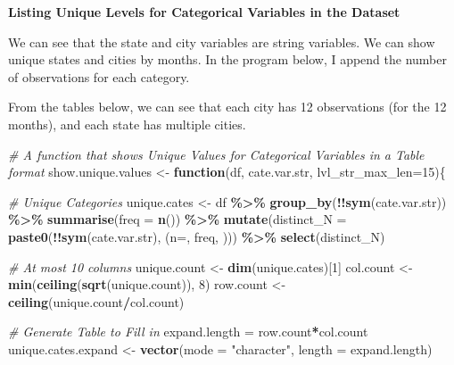 \documentclass[
]{book}
\newenvironment{Shaded}{\begin{snugshade}}{\end{snugshade}}
\newcommand{\CommentTok}[1]{\textcolor[rgb]{0.56,0.35,0.01}{\textit{#1}}}
\newcommand{\ControlFlowTok}[1]{\textcolor[rgb]{0.13,0.29,0.53}{\textbf{#1}}}
\newcommand{\DataTypeTok}[1]{\textcolor[rgb]{0.13,0.29,0.53}{#1}}
\newcommand{\DecValTok}[1]{\textcolor[rgb]{0.00,0.00,0.81}{#1}}
\newcommand{\KeywordTok}[1]{\textcolor[rgb]{0.13,0.29,0.53}{\textbf{#1}}}
\newcommand{\NormalTok}[1]{#1}
\newcommand{\OperatorTok}[1]{\textcolor[rgb]{0.81,0.36,0.00}{\textbf{#1}}}
\newcommand{\StringTok}[1]{\textcolor[rgb]{0.31,0.60,0.02}{#1}}
\begin{document}
\textbf{Listing Unique Levels for Categorical Variables in the Dataset}

We can see that the state and city variables are string variables. We can show unique states and cities by months. In the program below, I append the number of observations for each category.

From the tables below, we can see that each city has 12 observations (for the 12 months), and each state has multiple cities.

\begin{Shaded}
\begin{Highlighting}[]
\CommentTok{\# A function that shows Unique Values for Categorical Variables in a Table format}
\NormalTok{show.unique.values \textless{}{-}}\StringTok{ }\ControlFlowTok{function}\NormalTok{(df, cate.var.str, }\DataTypeTok{lvl\_str\_max\_len=}\DecValTok{15}\NormalTok{)\{}

    \CommentTok{\# Unique Categories}
\NormalTok{    unique.cates \textless{}{-}}\StringTok{ }\NormalTok{df }\OperatorTok{\%\textgreater{}\%}
\StringTok{        }\KeywordTok{group\_by}\NormalTok{(}\OperatorTok{!!}\KeywordTok{sym}\NormalTok{(cate.var.str)) }\OperatorTok{\%\textgreater{}\%}
\StringTok{        }\KeywordTok{summarise}\NormalTok{(}\DataTypeTok{freq =} \KeywordTok{n}\NormalTok{()) }\OperatorTok{\%\textgreater{}\%}
\StringTok{        }\KeywordTok{mutate}\NormalTok{(}\DataTypeTok{distinct\_N =} \KeywordTok{paste0}\NormalTok{(}\OperatorTok{!!}\KeywordTok{sym}\NormalTok{(cate.var.str), }\StringTok{\textquotesingle{} (n=\textquotesingle{}}\NormalTok{, freq, }\StringTok{\textquotesingle{})\textquotesingle{}}\NormalTok{)) }\OperatorTok{\%\textgreater{}\%}
\StringTok{        }\KeywordTok{select}\NormalTok{(distinct\_N)}

    \CommentTok{\# At most 10 columns}
\NormalTok{    unique.count \textless{}{-}}\StringTok{ }\KeywordTok{dim}\NormalTok{(unique.cates)[}\DecValTok{1}\NormalTok{]}
\NormalTok{    col.count \textless{}{-}}\StringTok{ }\KeywordTok{min}\NormalTok{(}\KeywordTok{ceiling}\NormalTok{(}\KeywordTok{sqrt}\NormalTok{(unique.count)), }\DecValTok{8}\NormalTok{)}
\NormalTok{    row.count \textless{}{-}}\StringTok{ }\KeywordTok{ceiling}\NormalTok{(unique.count}\OperatorTok{/}\NormalTok{col.count)}

    \CommentTok{\# Generate Table to Fill in}
\NormalTok{    expand.length =}\StringTok{ }\NormalTok{row.count}\OperatorTok{*}\NormalTok{col.count}
\NormalTok{    unique.cates.expand \textless{}{-}}\StringTok{ }\KeywordTok{vector}\NormalTok{(}\DataTypeTok{mode =} \StringTok{"character"}\NormalTok{, }\DataTypeTok{length =}\NormalTok{ expand.length)}


\end{Highlighting}
\end{Shaded}
\end{document}
